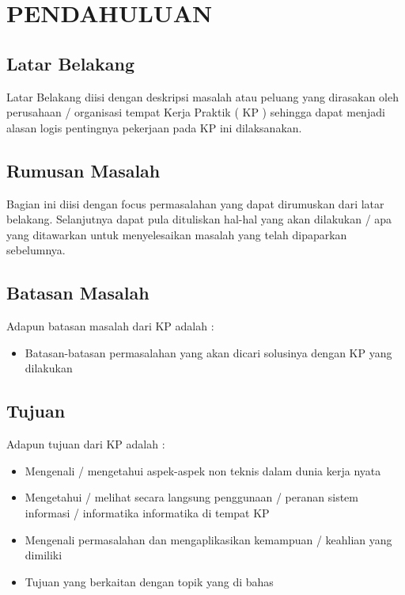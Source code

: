 \documentclass[oneside,listof=totoc]{scrbook}
\begin{document}
\tableofcontents
\listoftables
\listoffigures

\mainmatter
\pagestyle{fancy}\fancyhf{}\fancyhead[R]{\thepage}
\renewcommand{\headrulewidth}{0pt}

\chapter{PENDAHULUAN}

\vspace{0.5cm}

\section{Latar Belakang}
\indent Latar Belakang diisi dengan deskripsi masalah atau peluang yang dirasakan oleh perusahaan / organisasi tempat Kerja Praktik ( KP ) sehingga dapat menjadi alasan logis pentingnya pekerjaan pada KP ini dilaksanakan.

\section{Rumusan Masalah}
Bagian ini diisi dengan focus permasalahan yang dapat dirumuskan dari latar belakang. Selanjutnya dapat pula dituliskan hal-hal yang akan dilakukan / apa yang ditawarkan untuk menyelesaikan masalah yang telah dipaparkan sebelumnya.

\section{Batasan Masalah}
Adapun batasan masalah dari KP adalah :
\begin{itemize}
  \item Batasan-batasan permasalahan yang akan dicari solusinya dengan KP yang dilakukan
\end{itemize}

\section{Tujuan}
Adapun tujuan dari KP adalah :
\begin{itemize}
  \item Mengenali / mengetahui aspek-aspek non teknis dalam dunia kerja nyata
  \item Mengetahui / melihat secara langsung penggunaan / peranan sistem informasi / informatika informatika di tempat KP
  \item Mengenali permasalahan dan mengaplikasikan kemampuan / keahlian yang dimiliki
  \item Tujuan yang berkaitan dengan topik yang di bahas
\end{itemize}
\end{document}
